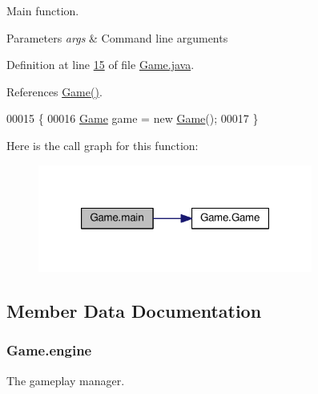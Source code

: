 Main function. 


\begin{DoxyParams}{Parameters}
{\em args} & Command line arguments \\
\hline
\end{DoxyParams}


Definition at line \hyperlink{Game_8java_source_l00015}{15} of file \hyperlink{Game_8java_source}{Game.\-java}.



References \hyperlink{Game_8java_source_l00032}{Game()}.


\begin{DoxyCode}
00015                                            \{
00016         \hyperlink{classGame}{Game} game = \textcolor{keyword}{new} \hyperlink{classGame_a2e034e53e9c032964ecd2a831b29a616}{Game}();
00017     \}
\end{DoxyCode}


Here is the call graph for this function\-:
\nopagebreak
\begin{figure}[H]
\begin{center}
\leavevmode
\includegraphics[width=256pt]{classGame_ae52595a27ac1b327b05db2129ad81fca_cgraph}
\end{center}
\end{figure}




\subsection{Member Data Documentation}
\hypertarget{classGame_a899fc9c2339c51abd4594b6a5e44284f}{
\subsubsection[{engine}]{ Game.\-engine\hspace{0.3cm}{\ttfamily [private]}}}\label{classGame_a899fc9c2339c51abd4594b6a5e44284f}


The gameplay manager. 



